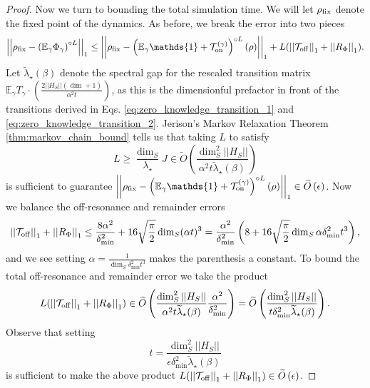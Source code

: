 \documentclass[
 amsmath,amssymb,
 aps,
onecolumn, 
nofootinbib]{revtex4-2}
\newcommand{\on}{\rm on}
\newcommand{\off}{\rm off}
\newcommand{\norm}[1]{\left|\left| #1 \right|\right|}
\newcommand{\EE}{\mathbb{E}}
\newcommand{\TT}{\mathcal{T}}
\newcommand{\bigotilde}[1]{\widetilde{O} \left( #1 \right)}
\newcommand{\identity}{\mathds{1}}
\begin{document}
\begin{proof}
    Now we turn to bounding the total simulation time. We will let $\rho_{\rm fix}$ denote the fixed point of the dynamics. As before, we break the error into two pieces
    \begin{equation}
        \norm{\rho_{\rm fix} - \left(\EE_\gamma \Phi_\gamma \right)^{\circ L}}_1 \le \norm{\rho_{\rm fix} - \left(\EE_\gamma \identity + \TT_{\on}^{(\gamma)}\right)^{\circ L} (\rho)}_1 + L(\norm{\TT_{\off}}_1 + \norm{R_{\Phi}}_1).
    \end{equation}
    Let $\widetilde{\lambda}_\star(\beta)$ denote the spectral gap for the rescaled transition matrix $\EE_\gamma T_\gamma \cdot \left(\frac{2 \norm{H_S} (\dim + 1)}{\alpha^2 t}\right)$, as this is the dimensionful prefactor in front of the transitions derived in Eqs. \eqref{eq:zero_knowledge_transition_1} and \eqref{eq:zero_knowledge_transition_2}. Jerison's Markov Relaxation Theorem \ref{thm:markov_chain_bound} tells us that taking $L$ to satisfy
    \begin{equation}
        L \ge \frac{\dim_S}{\lambda_\star} J \in \bigotilde{\frac{\dim_S^2 \norm{H_S}}{\alpha^2 t \widetilde{\lambda}_\star(\beta)}}\label{eq:Lbd}
    \end{equation}
    is sufficient to guarantee $\norm{\rho_{\rm fix} - \left(\EE_\gamma \identity + \TT_{\on}^{(\gamma)}\right)^{\circ L} (\rho)}_1 \in \bigotilde{\epsilon}$. Now we balance the off-resonance and remainder errors
    \begin{equation}
        \norm{\TT_{\off}}_1 + \norm{R_{\Phi}}_1 \le \frac{8 \alpha^2}{\delta_{\min}^2} + 16 \sqrt{\frac{\pi}{2}} \dim_S (\alpha t)^3 = \frac{\alpha^2}{\delta_{\min}^2} \left( 8 + 16 \sqrt{\frac{\pi}{2}} \dim_S \alpha \delta_{\min}^2 t^3 \right),
    \end{equation}
    and we see setting $\alpha = \frac{1}{\dim_S \delta_{\min}^2 t^3}$ makes the parenthesis a constant.
    To bound the total off-resonance and remainder error we take the product
    \begin{equation}
        L(\norm{\TT_{\off}}_1 + \norm{R_{\Phi}}_1) \in \bigotilde{\frac{\dim_S^2 \norm{H_S}}{\alpha^2 t \widetilde{\lambda}_\star(\beta)} \frac{\alpha^2}{\delta_{\min}^2}} = \bigotilde{\frac{\dim_S^2 \norm{H_S}}{ t \delta_{\min}^2 \widetilde{\lambda}_\star(\beta)} }.
    \end{equation}
    Observe that setting 
    \begin{equation}
        t = \frac{\dim_S^2 \norm{H_S}}{\epsilon \delta_{\min}^2 \widetilde{\lambda}_\star(\beta)}
    \end{equation} 
    is sufficient to make the above product $L(\norm{\TT_{\off}}_1 + \norm{R_{\Phi}}_1) \in\bigotilde{\epsilon}$. 


\end{proof}
\end{document}
